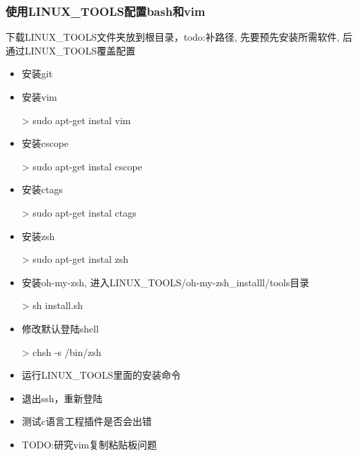 \subsubsection{使用LINUX\_TOOLS配置bash和vim}
下载LINUX\_TOOLS文件夹放到根目录，todo:补路径, 先要预先安装所需软件, 后通过LINUX\_TOOLS覆盖配置
\begin{itemize}

\item 安装git

\item 安装vim
\begin{commandbox}
 > sudo apt-get instal vim
\end{commandbox}

\item 安装cscope
\begin{commandbox}
 > sudo apt-get instal cscope
\end{commandbox}

\item 安装ctags
\begin{commandbox}
 > sudo apt-get instal ctags
\end{commandbox}

\item 安装zsh
\begin{commandbox}
 > sudo apt-get instal zsh
\end{commandbox}

\item 安装oh-my-zsh, 进入LINUX\_TOOLS/oh-my-zsh\_installl/tools目录
\begin{commandbox}
 > sh install.sh
\end{commandbox}

\item 修改默认登陆shell
\begin{commandbox}
 > chsh -s /bin/zsh
\end{commandbox}

\item 运行LINUX\_TOOLS里面的安装命令

\item 退出ssh，重新登陆

\item 测试c语言工程插件是否会出错

\item TODO:研究vim复制粘贴板问题
\end{itemize}


